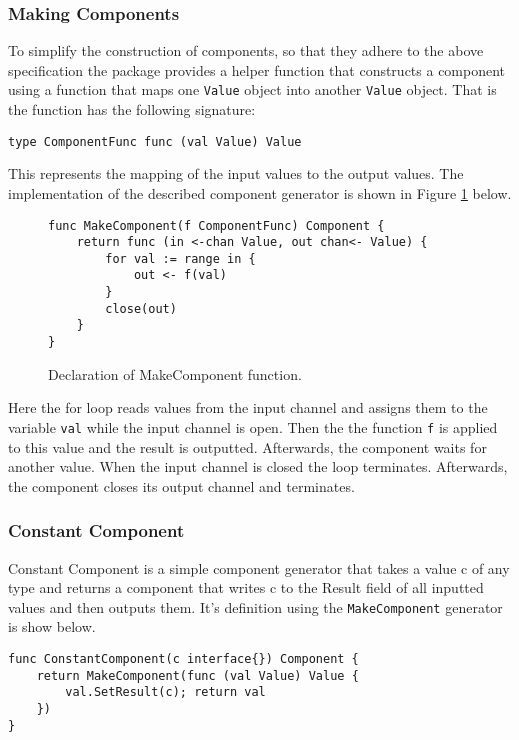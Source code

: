 \documentclass[12pt,a4paper]{article}
\begin{document}
\subsubsection{Making Components}
To simplify the construction of components, so that they adhere to 
the above specification the package provides a helper function that 
constructs a component using a function that maps one \texttt{Value} object 
into another \texttt{Value} object. 
That is the function has the following signature:
\begin{lstlisting}
type ComponentFunc func (val Value) Value
\end{lstlisting}
This represents the mapping of the input values to the output values. 
The implementation of the described component generator is shown in 
Figure \ref{fig:MakeComponent} below.
\begin{figure}[h]
\centering
\begin{lstlisting}
func MakeComponent(f ComponentFunc) Component {
    return func (in <-chan Value, out chan<- Value) {
        for val := range in {
            out <- f(val)
        }
        close(out)
    }
}
\end{lstlisting}
\caption[scale=1.0]{Declaration of MakeComponent function.}
\label{fig:MakeComponent}
\end{figure}

Here the for loop reads values from the input channel and assigns them
to the variable \texttt{val} while the input channel is open. Then the 
the function \texttt{f} is applied to this value and the result is outputted.
Afterwards, the component waits for another value. When the input channel
is closed the loop terminates. Afterwards, the component closes its output channel
and terminates.

\subsubsection{Constant Component}
Constant Component is a simple component generator that takes a value c
of any type and returns a component that writes c to the Result field of 
all inputted values and then outputs them. It's definition using the 
\texttt{MakeComponent} generator is show below.
\begin{lstlisting}
func ConstantComponent(c interface{}) Component {
    return MakeComponent(func (val Value) Value {
        val.SetResult(c); return val
    })
}
\end{lstlisting}
\end{document}
